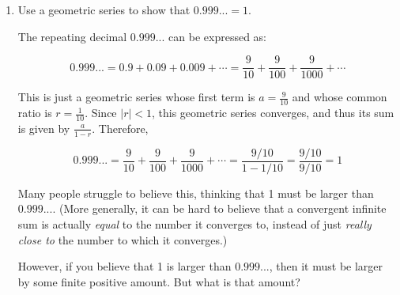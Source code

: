 \documentclass[main]{subfiles}
\begin{document}
\begin{enumerate}[resume]
\begin{enumerate}
\begin{solution}
    Most importantly, recall that $1+x+^2+\cdots$ is the Taylor series for the function $f(x)=\frac{1}{1-x}$ centered at 0. Therefore, this result also tells us that the Taylor series for $f(x)=\frac{1}{1-x}$ centered at 0 is actually \textit{equal} to $f(x)$ on the interval $(-1.1)$. This is the first example we have found where we can prove that a Taylor series of a function is not merely an approximation of the function, but actually equivalent to the function for some $x$-values!
    \end{solution}
   
  \end{enumerate}
  

 
  

      \item 
  \begin{problem}[\vfill]
Use a geometric series to show that $0.999...=1$. 

  \end{problem}
  
  \begin{solution}
  The repeating decimal $0.999...$ can be expressed as:
  
  $$0.999...=0.9+0.09+0.009+\cdots=\frac{9}{10}+\frac{9}{100}+\frac{9}{1000}+\cdots$$
  
  This is just a geometric series whose first term is $a=\frac{9}{10}$ and whose common ratio is $r=\frac{1}{10}$. Since $|r|<1$, this geometric series converges, and thus its sum is given by $\frac{a}{1-r}$. Therefore,
  
  $$0.999...=\frac{9}{10}+\frac{9}{100}+\frac{9}{1000}+\cdots=\frac{9/10}{1-1/10}=\frac{9/10}{9/10}=1$$
  
  Many people struggle to believe this, thinking that 1 must be larger than $0.999...$. (More generally, it can be hard to believe that a convergent infinite sum is actually \textit{equal} to the number it converges to, instead of just \textit{really close to} the number to which it converges.) 
  
However, if you believe that 1 is larger than $0.999...$, then it must be larger by some finite positive amount. But what is that amount?
  
  \end{solution}
 
  


    
   

  \end{enumerate}
\end{document}
